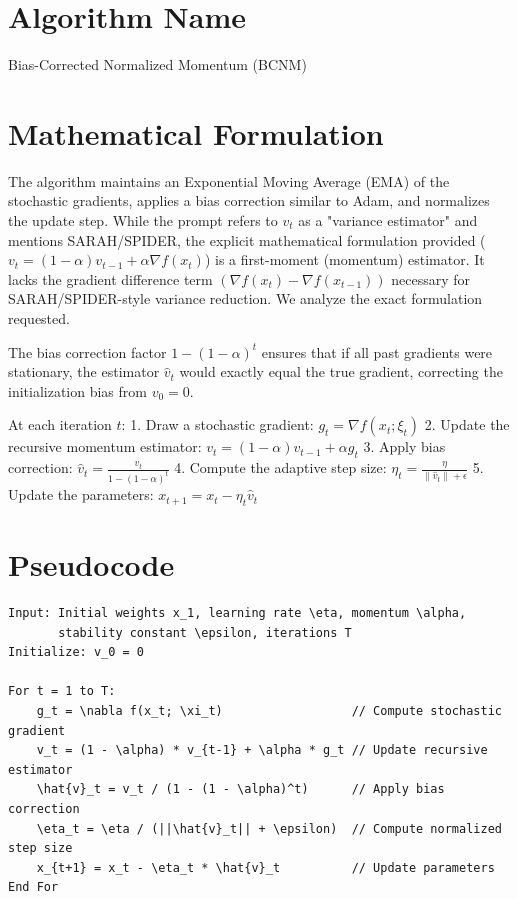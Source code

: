 \documentclass{article}
\begin{document}
\section*{Algorithm Name}
Bias-Corrected Normalized Momentum (BCNM)

\section*{Mathematical Formulation}
The algorithm maintains an Exponential Moving Average (EMA) of the stochastic gradients, applies a bias correction similar to Adam, and normalizes the update step. While the prompt refers to $v_t$ as a "variance estimator" and mentions SARAH/SPIDER, the explicit mathematical formulation provided ($v_t = (1-\alpha)v_{t-1} + \alpha \nabla f(x_t)$) is a first-moment (momentum) estimator. It lacks the gradient difference term $(\nabla f(x_t) - \nabla f(x_{t-1}))$ necessary for SARAH/SPIDER-style variance reduction. We analyze the exact formulation requested.

The bias correction factor $1 - (1-\alpha)^t$ ensures that if all past gradients were stationary, the estimator $\hat{v}_t$ would exactly equal the true gradient, correcting the initialization bias from $v_0 = 0$.

At each iteration $t$:
1. Draw a stochastic gradient: $g_t = \nabla f(x_t; \xi_t)$
2. Update the recursive momentum estimator: $v_t = (1-\alpha)v_{t-1} + \alpha g_t$
3. Apply bias correction: $\hat{v}_t = \frac{v_t}{1 - (1-\alpha)^t}$
4. Compute the adaptive step size: $\eta_t = \frac{\eta}{\|\hat{v}_t\| + \epsilon}$
5. Update the parameters: $x_{t+1} = x_t - \eta_t \hat{v}_t$

\section*{Pseudocode}
\begin{verbatim}
Input: Initial weights x_1, learning rate \eta, momentum \alpha, 
       stability constant \epsilon, iterations T
Initialize: v_0 = 0

For t = 1 to T:
    g_t = \nabla f(x_t; \xi_t)                  // Compute stochastic gradient
    v_t = (1 - \alpha) * v_{t-1} + \alpha * g_t // Update recursive estimator
    \hat{v}_t = v_t / (1 - (1 - \alpha)^t)      // Apply bias correction
    \eta_t = \eta / (||\hat{v}_t|| + \epsilon)  // Compute normalized step size
    x_{t+1} = x_t - \eta_t * \hat{v}_t          // Update parameters
End For
\end{verbatim}
\end{document}
